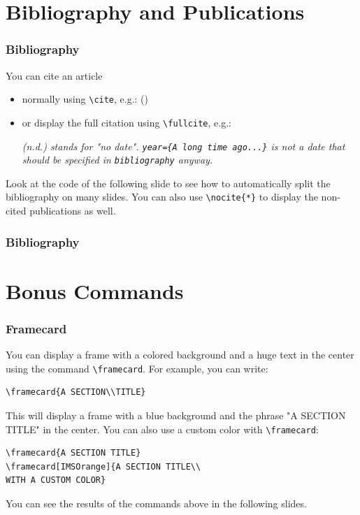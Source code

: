 \documentclass[usenames,dvipsnames,10pt,aspectratio=169]{beamer}
\begin{document}
\section{Bibliography and Publications}
\begin{frame}[fragile]
\frametitle{Bibliography}

You can cite an article
\begin{itemize}
\item normally using \texttt{\textbackslash cite}, e.g.: (\cite{article1})
\item or display the full citation using \texttt{\textbackslash fullcite}, e.g.:   \\\vspace{0.4cm}

\textit{(n.d.) stands for "no date". \texttt{year=\{A long time ago...\}} is not a date that should be specified in \texttt{bibliography} anyway.}
\end{itemize}

\vskip 0.5cm
Look at the code of the following slide to see how to automatically split the bibliography on many slides. You can also use \texttt{\textbackslash nocite\{*\}} to display the non-cited publications as well.

\end{frame}

\begin{frame}[t,allowframebreaks]
\frametitle{Bibliography}

\nocite{*} %

\printbibliography

\end{frame}

\section{Bonus Commands}

\begin{frame}[fragile]
\frametitle{Framecard}

You can display a frame with a colored background and a huge text in the center using the command \texttt{\textbackslash framecard}.
\vskip 0.5cm 
For example, you can write:
\begin{verbatim}
\framecard{A SECTION\\TITLE}
\end{verbatim}

This will display a frame with a blue background and the phrase "A SECTION TITLE" in the center. You can also use a custom color with \texttt{\textbackslash framecard}:
\begin{verbatim}
\framecard{A SECTION TITLE}
\framecard[IMSOrange]{A SECTION TITLE\\
WITH A CUSTOM COLOR}
\end{verbatim}
You can see the results of the commands above in the following slides.

\end{frame}
\end{document}
